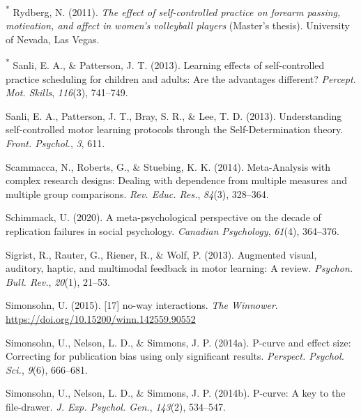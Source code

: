 \documentclass[
  english,
  man, donotrepeattitle,floatsintext]{apa7}
\newlength{\cslhangindent}
\newlength{\cslentryspacingunit} %
\newenvironment{CSLReferences}[2] %
 {%
  \setlength{\parindent}{0pt}
  \ifodd #1
  \let\oldpar\par
  \def\par{\hangindent=\cslhangindent\oldpar}
  \fi
  \setlength{\parskip}{#2\cslentryspacingunit}
 }%
 {}
\begin{document}
\begin{CSLReferences}{1}{0}
\leavevmode{}%
\textsuperscript{*} Rydberg, N. (2011). \emph{The effect of self-controlled practice on forearm passing, motivation, and affect in women's volleyball players} (Master's thesis). University of Nevada, Las Vegas.

\leavevmode{}%
\textsuperscript{*} Sanli, E. A., \& Patterson, J. T. (2013). Learning effects of self-controlled practice scheduling for children and adults: Are the advantages different? \emph{Percept. Mot. Skills}, \emph{116}(3), 741--749.

\leavevmode{}%
Sanli, E. A., Patterson, J. T., Bray, S. R., \& Lee, T. D. (2013). Understanding self-controlled motor learning protocols through the {Self-Determination} theory. \emph{Front. Psychol.}, \emph{3}, 611.

\leavevmode{}%
Scammacca, N., Roberts, G., \& Stuebing, K. K. (2014). {Meta-Analysis} with complex research designs: Dealing with dependence from multiple measures and multiple group comparisons. \emph{Rev. Educ. Res.}, \emph{84}(3), 328--364.

\leavevmode{}%
Schimmack, U. (2020). A meta-psychological perspective on the decade of replication failures in social psychology. \emph{Canadian Psychology}, \emph{61}(4), 364--376.

\leavevmode{}%
Sigrist, R., Rauter, G., Riener, R., \& Wolf, P. (2013). Augmented visual, auditory, haptic, and multimodal feedback in motor learning: A review. \emph{Psychon. Bull. Rev.}, \emph{20}(1), 21--53.

\leavevmode{}%
Simonsohn, U. (2015). {[}17{]} no-way interactions. \emph{The Winnower}. \url{https://doi.org/10.15200/winn.142559.90552}

\leavevmode{}%
Simonsohn, U., Nelson, L. D., \& Simmons, J. P. (2014a). P-curve and effect size: Correcting for publication bias using only significant results. \emph{Perspect. Psychol. Sci.}, \emph{9}(6), 666--681.

\leavevmode{}%
Simonsohn, U., Nelson, L. D., \& Simmons, J. P. (2014b). P-curve: A key to the file-drawer. \emph{J. Exp. Psychol. Gen.}, \emph{143}(2), 534--547.


\end{CSLReferences}
\end{document}
